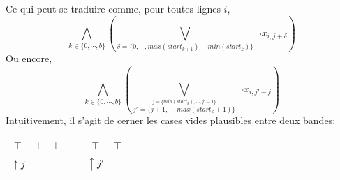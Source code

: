 \documentclass[a4paper,12pt]{report}
\newcommand\black{\cellcolor{black}}
\begin{document}
\begin{enumerate}
	Ce qui peut se traduire comme, pour toutes lignes $i$,
			$$\bigwedge_{k\in\{0,\cdots,b\}}\left( 
				\bigvee_{\delta=\{0,\cdots,max(start_{k+1})-min(start_k)\}} \lnot x_{i,j+\delta} 
			\right)$$
	Ou encore, 		
			$$\bigwedge_{k\in\{0,\cdots,b\}}\left(
				\bigvee_{
					\stackrel{j=\{min(start_k), \cdots,j'-1\}}{j'=\{j+1, \cdots,max(start_k+1)\}}
					}
				\lnot x_{i,j'-j} 
			\right)$$
	Intuitivement, il s'agit de cerner les cases vides plausibles entre deux bandes:		
			\begin{center}						
			\begin{tabular}{|c|c|c|c|c|c|}
			\hline 
			\black &   &    &   & \black & \black   \\ 			
			\hline 
			$\top$ & $\bot$ & $\bot$  & $\bot$ & $\top$ & $\top$ \\ 
			\hline  
			$\uparrow j$ & \multicolumn{3}{c|}{} & $\uparrow j'$ & \\ 
			\hline
			\end{tabular}
			\end{center}
\end{enumerate}
\end{document}

